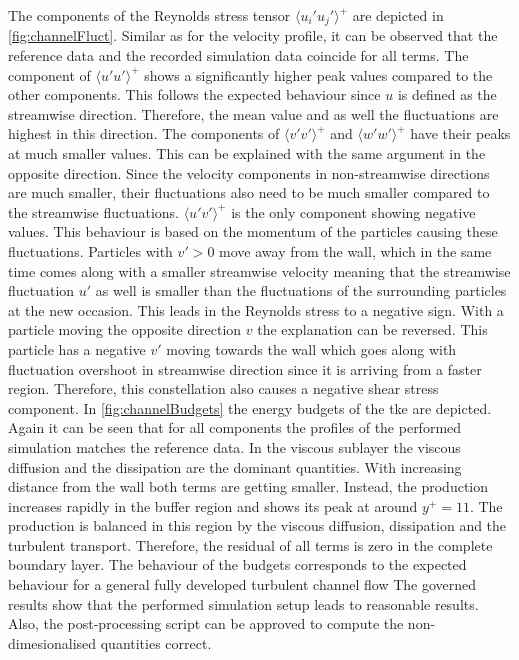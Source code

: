 The components of the Reynolds stress tensor $\langle u_i'u_j'\rangle ^+$ are depicted in \autoref{fig:channelFluct}.
Similar as for the velocity profile, it can be observed that the reference data and the recorded simulation data coincide for all terms.
The component of $\langle u'u'\rangle ^+$ shows a significantly higher peak values compared to the other components.
This follows the expected behaviour since $u$ is defined as the streamwise direction.
Therefore, the mean value and as well the fluctuations are highest in this direction.
The components of $\langle v'v'\rangle ^+$ and $\langle w'w'\rangle ^+$ have their peaks at much smaller values.
This can be explained with the same argument in the opposite direction.
Since the velocity components in non-streamwise directions are much smaller, their fluctuations also need to be much smaller compared to the streamwise fluctuations.
$\langle u'v'\rangle ^+$ is the only component showing negative values.
This behaviour is based on the momentum of the particles causing these fluctuations.
Particles with $v' > 0$ move away from the wall, which in the same time comes along with a smaller streamwise velocity meaning that the streamwise fluctuation $u'$ as well is smaller than the fluctuations of the surrounding particles at the new occasion.
This leads in the Reynolds stress to a negative sign.
With a particle moving the opposite direction $v$ the explanation can be reversed.
This particle has a negative $v'$ moving towards the wall which goes along with fluctuation overshoot in streamwise direction since it is arriving from a faster region. 
Therefore, this constellation also causes a negative shear stress component.
In \autoref{fig:channelBudgets} the energy budgets of the \acrshort{tke} are depicted.
Again it can be seen that for all components the profiles of the performed simulation matches the reference data.
In the viscous sublayer the viscous diffusion and the dissipation are the dominant quantities.
With increasing distance from the wall both terms are getting smaller.
Instead, the production increases rapidly in the buffer region and shows its peak at around $y ^+ = 11$.
The production is balanced in this region by the viscous diffusion, dissipation and the turbulent transport.
Therefore, the residual of all terms is zero in the complete boundary layer.
The behaviour of the budgets corresponds to the expected behaviour for a general fully developed turbulent channel flow 
The governed results show that the performed simulation setup leads to reasonable results.
Also, the post-processing script can be approved to compute the non-dimesionalised quantities correct.



